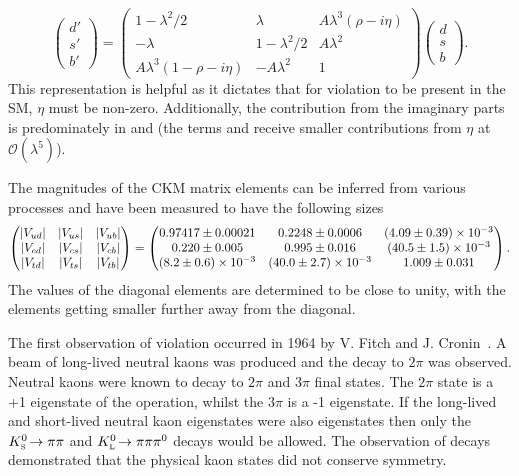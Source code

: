 \begin{equation}
\left( \begin{array}{c} d' \\ s'  \\ b' \end{array} \right) = \begin{pmatrix} 1 - \lambda^2/2 & \lambda & A\lambda^3(\rho-i\eta) \\ -\lambda & 1-\lambda^2/2 & A\lambda^2  \\ A\lambda^3(1-\rho-i\eta) & -A\lambda^2 & 1 \end{pmatrix} \left( \begin{array}{c} d \\ s  \\ b \end{array} \right).
\end{equation}
This representation is helpful as it dictates that for \CP violation to be present in the SM, $\eta$ must be non-zero. Additionally, the contribution from the imaginary parts is predominately in \Vub and \Vtd (the terms \Vcd and \Vts receive smaller contributions from $\eta$ at $\mathcal{O}(\lambda^{5})$). 

The magnitudes of the CKM matrix elements can be inferred from various processes and have been measured to have the following sizes~\cite{PDG2016}
\begin{equation} 
    \begin{pmatrix} 
        |{V_{{u}{d}}}| & |{V_{{u}{s}}}| & |{V_{{u}{b}}}| \\ 
        |{V_{{c}{d}}}| & |{V_{{c}{s}}}| & |{V_{{c}{b}}}|  \\
        |{V_{{t}{d}}}| & |{V_{{t}{s}}}| & |{V_{{t}{b}}}| 
    \end{pmatrix}
    =
    \begin{pmatrix} 
        0.97417\pm0.00021        & 0.2248\pm0.0006           & (4.09\pm0.39)\times10^{-3}\\ 
        0.220\pm0.005            & 0.995\pm0.016             & (40.5\pm1.5)\times10^{-3} \\
        (8.2\pm0.6)\times10^{-3} & (40.0\pm2.7)\times10^{-3} & 1.009\pm0.031            
    \end{pmatrix}.
\end{equation}
The values of the diagonal elements are determined to be close to unity, with the elements getting smaller further away from the diagonal.

The first observation of \CP violation occurred in 1964 by V. Fitch and J. Cronin~\cite{PhysRevLett.13.138}.  
A beam of long-lived neutral kaons was produced and the decay to $2\pi$ was observed. Neutral kaons were known to decay to $2\pi$ and $3\pi$ final states. The $2\pi$ state is a +1 eigenstate of the \CP operation, whilst the $3\pi$ is a -1 eigenstate. If the long-lived and short-lived neutral kaon eigenstates were also \CP eigenstates then only the ${{K}^0_{\mathrm{ \scriptscriptstyle S}}}\!\rightarrow \pi\pi$ and ${{K}^0_{\mathrm{ \scriptscriptstyle L}}}\!\rightarrow \pi\pi{\ensuremath{{\pi}^0}}$ decays would be allowed. The observation of \decay{\KL}{\pip\pim} decays demonstrated that the physical kaon states did not conserve \CP symmetry. 

